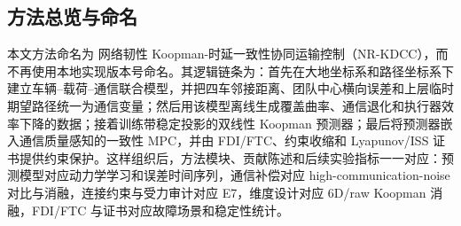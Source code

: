 \documentclass[twocolumn,3p,times,procedia]{elsarticle}
\newcommand{\Method}{NR-KDCC}
\newcommand{\MethodCN}{网络韧性 Koopman-时延一致性协同运输控制}
\begin{document}
\subsection{方法总览与命名}

本文方法命名为 \MethodCN{}（\Method{}），而不再使用本地实现版本号命名。其逻辑链条为：首先在大地坐标系和路径坐标系下建立车辆--载荷--通信联合模型，并把四车邻接距离、团队中心横向误差和上层临时期望路径统一为通信变量；然后用该模型离线生成覆盖曲率、通信退化和执行器效率下降的数据；接着训练带稳定投影的双线性 Koopman 预测器；最后将预测器嵌入通信质量感知的一致性 MPC，并由 FDI/FTC、约束收缩和 Lyapunov/ISS 证书提供约束保护。这样组织后，方法模块、贡献陈述和后续实验指标一一对应：预测模型对应动力学学习和误差时间序列，通信补偿对应 high-communication-noise 对比与消融，连接约束与受力审计对应 E7，维度设计对应 6D/raw Koopman 消融，FDI/FTC 与证书对应故障场景和稳定性统计。
\end{document}
